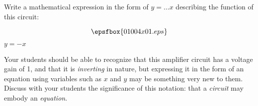 

Write a mathematical expression in the form of $y = \dots x$ describing the function of this circuit:

$$\epsfbox{01004x01.eps}$$







$y = -x$







Your students should be able to recognize that this amplifier circuit has a voltage gain of 1, and that it is {\it inverting} in nature, but expressing it in the form of an equation using variables such as $x$ and $y$ may be something very new to them.  Discuss with your students the significance of this notation: that a {\it circuit} may embody an {\it equation}.




